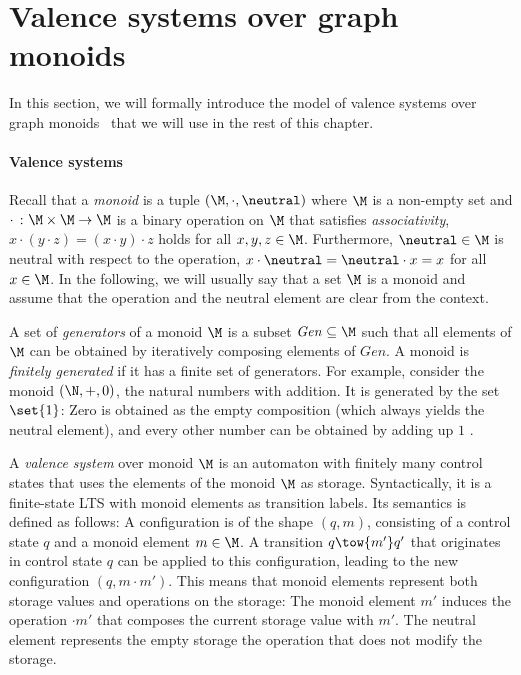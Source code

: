 \documentclass[../../diss.tex]{subfiles}
\begin{document}
\section{Valence systems over graph monoids}%
\label{Valence:Systems}

In this section, we will formally introduce the model of valence systems over graph monoids~\cite{Zetzsche15d} that we will use in the rest of this chapter.

\paragraph{Valence systems}

Recall that a \emph{monoid} is a tuple $(\monoid,\cdot,\neutral)$ where $\monoid$ is a non-empty set and $\cdot \ \colon \monoid \times \monoid \to \monoid$ is a binary operation on $\monoid$ that satisfies \emph{associativity}, \ie $x \cdot (y \cdot z) = (x \cdot y) \cdot z$ holds for all $x,y,z \in \monoid$.
Furthermore, $\neutral \in \monoid$ is neutral with respect to the operation, $x \cdot \neutral = \neutral \cdot x = x$ for all $x \in \monoid$.
In the following, we will usually say that a set $\monoid$ is a monoid and assume that the operation and the neutral element are clear from the context.

A set of \emph{generators} of a monoid $\monoid$ is a subset $\mathit{Gen} \subseteq \monoid$ such that all elements of $\monoid$ can be obtained by iteratively composing elements of $\mathit{Gen}$.
A monoid is \emph{finitely generated} if it has a finite set of generators.
%
For example, consider the monoid $(\N,+,0)$, the natural numbers with addition.
It is generated by the set $\set{1}$: Zero is obtained as the empty composition (which always yields the neutral element), and every other number can be obtained by adding up $1$ .

A \emph{valence system} over monoid $\monoid$ is an automaton with finitely many control states that uses the elements of the monoid $\monoid$ as storage.
Syntactically, it is a finite-state LTS with monoid elements as transition labels.
Its semantics is defined as follows:
A configuration is of the shape $(q,m)$, consisting of a control state $q$ and a monoid element $m \in \monoid$.
A transition $q \tow{m'} q'$ that originates in control state $q$ can be applied to this configuration, leading to the new configuration $(q, m \cdot m')$.
%
This means that monoid elements represent both storage values and operations on the storage:
The monoid element $m'$ induces the operation $\cdot m'$ that composes the current storage value with $m'$.
The neutral element represents the empty storage \resp the operation that does not modify the storage.
\end{document}
